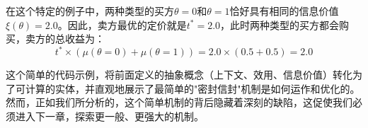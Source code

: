 在这个特定的例子中，两种类型的买方$\theta=0$和$\theta=1$恰好具有相同的信息价值$\xi(\theta)=2.0$。因此，卖方最优的定价就是$t^*=2.0$，此时两种类型的买方都会购买，卖方的总收益为：
$$t^* \times (\mu(\theta=0) + \mu(\theta=1)) = 2.0 \times (0.5 + 0.5) = 2.0$$

这个简单的代码示例，将前面定义的抽象概念（上下文、效用、信息价值）转化为了可计算的实体，并直观地展示了最简单的"密封信封"机制是如何运作和优化的。然而，正如我们所分析的，这个简单机制的背后隐藏着深刻的缺陷，这促使我们必须进入下一章，探索更一般、更强大的机制。